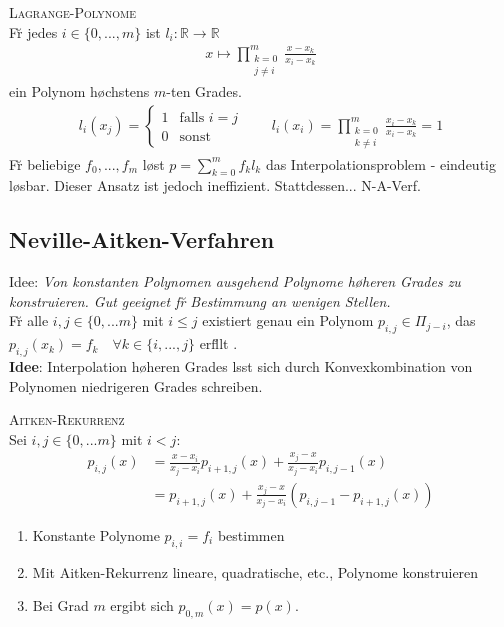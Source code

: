 \textsc{Lagrange-Polynome}\\
F\u r jedes $i \in \{0,...,m\}$ ist $l_i : \mathbb{R} \rightarrow \mathbb{R}$
\begin{align*}
x \mapsto \prod_{\substack{k=0 \\ j\neq i}}^m \frac{x-x_k}{x_i - x_k}
\end{align*}
ein Polynom h\o chstens $m$-ten Grades. 
\begin{align*}
l_i(x_j) = \begin{cases}
1 & \text{falls } i=j \\
0 & \text{sonst}
\end{cases}
\qquad 
l_i(x_i) = \prod_{\substack{k=0 \\ k\neq i}}^m \frac{x_i-x_k}{x_i - x_k} = 1
\end{align*}
F\u r beliebige $f_0, ..., f_m$ l\o st $p=\sum_{k=0}^m f_kl_k$ das Interpolationsproblem - eindeutig l\o sbar. Dieser Ansatz ist jedoch ineffizient. 
Stattdessen... N-A-Verf.

\subsection{Neville-Aitken-Verfahren}
Idee: \emph{Von konstanten Polynomen ausgehend Polynome h\o heren Grades zu konstruieren. Gut geeignet f\u r Bestimmung an wenigen Stellen.}\\
F\u r alle $i,j \in \{0,...m\}$ mit $i\leq j$ existiert genau ein Polynom $p_{i,j} \in \Pi_{j-i}$, das $p_{i,j}(x_k) = f_k \quad \forall k \in \{i,...,j\}$ erf\u llt .\\
\textbf{Idee}: Interpolation h\o heren Grades l\a sst sich durch Konvexkombination von Polynomen niedrigeren Grades schreiben.\vspace{0.2cm}

\textsc{Aitken-Rekurrenz}\\
Sei $i,j \in \{0,...m\}$ mit $i < j$:
\begin{align*}
p_{i,j}(x) &= \frac{x-x_i}{x_j-x_i} p_{i+1,j}(x) + \frac{x_j-x}{x_j-x_i}p_{i,j-1}(x) \\
&= p_{i+1,j}(x) + \frac{x_j-x}{x_j-x_i} (p_{i,j-1} - p_{i+1,j}(x))
\end{align*}
\begin{enumerate}
\item Konstante Polynome $p_{i,i} = f_i$ bestimmen
\item Mit Aitken-Rekurrenz lineare, quadratische, etc., Polynome konstruieren
\item Bei Grad $m$ ergibt sich $p_{0,m}(x) = p(x)$.
\end{enumerate}

